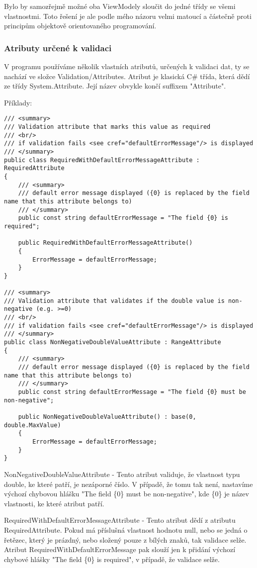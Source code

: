 Bylo by samozřejmě možné oba ViewModely sloučit do jedné třídy se všemi vlastnostmi. Toto řešení je ale podle mého názoru velmi matoucí a částečně proti principům objektově orientovaného programování.

\subsubsection*{Atributy určené k validaci}

V programu používáme několik vlastních atributů, určených k validaci dat, ty se nachází ve složce Validation/Attributes.
Atribut je klasická C\# třída, která dědí ze třídy System.Attribute. Její název obvykle končí suffixem "Attribute".

Příklady:
\begin{lstlisting}
/// <summary>
/// Validation attribute that marks this value as required
/// <br/>
/// if validation fails <see cref="defaultErrorMessage"/> is displayed
/// </summary>
public class RequiredWithDefaultErrorMessageAttribute : RequiredAttribute
{
	/// <summary>
	/// default error message displayed ({0} is replaced by the field name that this attribute belongs to)
	/// </summary>
	public const string defaultErrorMessage = "The field {0} is required";
	
	public RequiredWithDefaultErrorMessageAttribute()
	{
		ErrorMessage = defaultErrorMessage;
	}
}

/// <summary>
/// Validation attribute that validates if the double value is non-negative (e.g. >=0)
/// <br/>
/// if validation fails <see cref="defaultErrorMessage"/> is displayed
/// </summary>
public class NonNegativeDoubleValueAttribute : RangeAttribute
{
	/// <summary>
	/// default error message displayed ({0} is replaced by the field name that this attribute belongs to)
	/// </summary>
	public const string defaultErrorMessage = "The field {0} must be non-negative";
	
	public NonNegativeDoubleValueAttribute() : base(0, double.MaxValue)
	{
		ErrorMessage = defaultErrorMessage;
	}
}
\end{lstlisting}

NonNegativeDoubleValueAttribute - Tento atribut validuje, že vlastnost typu double, ke které patří, je nezáporné číslo. V případě, že tomu tak není, nastavíme výchozí chybovou hlášku "The field \{0\} must be non-negative", kde \{0\} je název vlastnosti, ke které atribut patří.

RequiredWithDefaultErrorMessageAttribute - Tento atribut dědí z atributu RequiredAttribute. Pokud má příslušná vlastnost hodnotu null, nebo se jedná o řetězec, který je prázdný, nebo složený pouze z bílých znaků, tak validace selže. Atribut RequiredWithDefaultErrorMessage pak slouží jen k přidání výchozí chybové hlášky "The field \{0\} is required", v případě, že validace selže.

